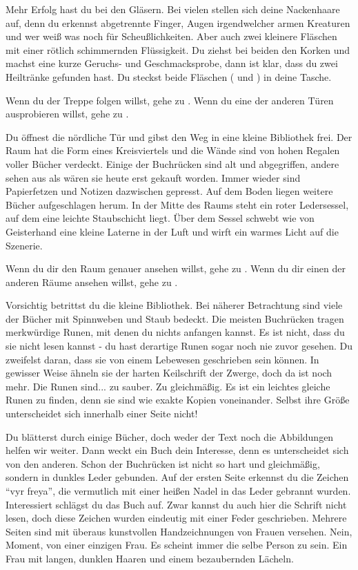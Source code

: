 Mehr Erfolg hast du bei den Gläsern. Bei vielen stellen sich deine Nackenhaare auf, denn du erkennst abgetrennte Finger, Augen irgendwelcher armen Kreaturen und wer weiß was noch für Scheußlichkeiten. Aber auch zwei kleinere Fläschen mit einer rötlich schimmernden Flüssigkeit. Du ziehst bei beiden den Korken und machst eine kurze Geruchs- und Geschmacksprobe, dann ist klar, dass du zwei Heiltränke gefunden hast. Du steckst beide Fläschen ( und ) in deine Tasche.

Wenn du der Treppe folgen willst, gehe zu .
Wenn du eine der anderen Türen ausprobieren willst, gehe zu .


Du öffnest die nördliche Tür und gibst den Weg in eine kleine Bibliothek frei. Der Raum hat die Form eines Kreisviertels und die Wände sind von hohen Regalen voller Bücher verdeckt.
Einige der Buchrücken sind alt und abgegriffen, andere sehen aus als wären sie heute erst gekauft worden. Immer wieder sind Papierfetzen und Notizen dazwischen gepresst. Auf dem Boden liegen weitere Bücher aufgeschlagen herum.
In der Mitte des Raums steht ein roter Ledersessel, auf dem eine leichte Staubschicht liegt.
Über dem Sessel schwebt wie von Geisterhand eine kleine Laterne in der Luft und wirft ein warmes Licht auf die Szenerie.

Wenn du dir den Raum genauer ansehen willst, gehe zu .
Wenn du dir einen der anderen Räume ansehen willst, gehe zu .


Vorsichtig betrittst du die kleine Bibliothek. Bei näherer Betrachtung sind viele der Bücher mit Spinnweben und Staub bedeckt. Die meisten Buchrücken tragen merkwürdige Runen, mit denen du nichts anfangen kannst. Es ist nicht, dass du sie nicht lesen kannst - du hast derartige Runen sogar noch nie zuvor gesehen. Du zweifelst daran, dass sie von einem Lebewesen geschrieben sein können. In gewisser Weise ähneln sie der harten Keilschrift der Zwerge, doch da ist noch mehr. Die Runen sind... zu sauber. Zu gleichmäßig. Es ist ein leichtes gleiche Runen zu finden, denn sie sind wie exakte Kopien voneinander. Selbst ihre Größe unterscheidet sich innerhalb einer Seite nicht!

Du blätterst durch einige Bücher, doch weder der Text noch die Abbildungen helfen wir weiter. Dann weckt ein Buch dein Interesse, denn es unterscheidet sich von den anderen. Schon der Buchrücken ist nicht so hart und gleichmäßig, sondern in dunkles Leder gebunden. Auf der ersten Seite erkennst du die Zeichen ``vyr freya'', die vermutlich mit einer heißen Nadel in das Leder gebrannt wurden. Interessiert schlägst du das Buch auf. Zwar kannst du auch hier die Schrift nicht lesen, doch diese Zeichen wurden eindeutig mit einer Feder geschrieben. Mehrere Seiten sind mit überaus kunstvollen Handzeichnungen von Frauen versehen. Nein, Moment, von einer einzigen Frau. Es scheint immer die selbe Person zu sein. Ein Frau mit langen, dunklen Haaren und einem bezaubernden Lächeln.

